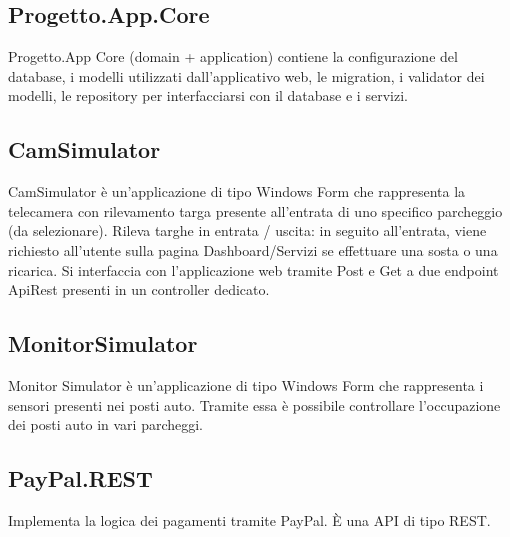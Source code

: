 \documentclass{article}
\begin{document}
\subsection{Progetto.App.Core}
Progetto.App Core (domain + application) contiene la configurazione del database, i modelli utilizzati dall'applicativo web, le migration, i validator dei modelli, le repository per interfacciarsi con il database e i servizi.
\subsection{CamSimulator}
CamSimulator è un'applicazione di tipo Windows Form che rappresenta la telecamera con
rilevamento targa presente all'entrata di uno specifico parcheggio (da selezionare).
Rileva targhe in entrata / uscita: in seguito all'entrata, viene richiesto all'utente sulla pagina Dashboard/Servizi se effettuare una sosta o una ricarica. Si interfaccia con l'applicazione web tramite Post e Get a due endpoint ApiRest presenti in un
controller dedicato.
\subsection{MonitorSimulator}
Monitor Simulator è un'applicazione di tipo Windows Form che rappresenta i sensori presenti nei posti auto. Tramite essa è possibile controllare l'occupazione dei posti auto in vari parcheggi.
\subsection{PayPal.REST}
Implementa la logica dei pagamenti tramite PayPal. È una API di tipo REST.
\end{document}
